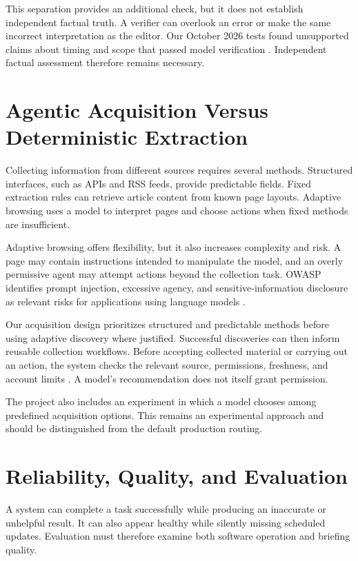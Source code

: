 This separation provides an additional check, but it does not establish independent factual truth. A verifier can overlook an error or make the same incorrect interpretation as the editor. Our October 2026 tests found unsupported claims about timing and scope that passed model verification \cite{v3twenty,v3overnight}. Independent factual assessment therefore remains necessary.

\section{Agentic Acquisition Versus Deterministic Extraction}

Collecting information from different sources requires several methods. Structured interfaces, such as APIs and RSS feeds, provide predictable fields. Fixed extraction rules can retrieve article content from known page layouts. Adaptive browsing uses a model to interpret pages and choose actions when fixed methods are insufficient.

Adaptive browsing offers flexibility, but it also increases complexity and risk. A page may contain instructions intended to manipulate the model, and an overly permissive agent may attempt actions beyond the collection task. OWASP identifies prompt injection, excessive agency, and sensitive-information disclosure as relevant risks for applications using language models \cite{owasp2025}.

Our acquisition design prioritizes structured and predictable methods before using adaptive discovery where justified. Successful discoveries can then inform reusable collection workflows. Before accepting collected material or carrying out an action, the system checks the relevant source, permissions, freshness, and account limits \cite{acquisition}. A model's recommendation does not itself grant permission.

The project also includes an experiment in which a model chooses among predefined acquisition options. This remains an experimental approach and should be distinguished from the default production routing.

\section{Reliability, Quality, and Evaluation}

A system can complete a task successfully while producing an inaccurate or unhelpful result. It can also appear healthy while silently missing scheduled updates. Evaluation must therefore examine both software operation and briefing quality.

